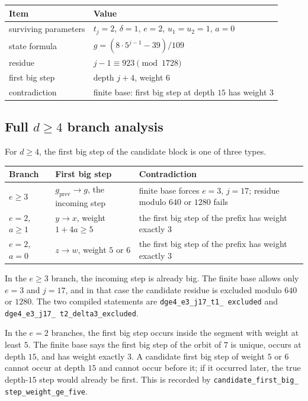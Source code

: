 \begin{center}
\small
\begin{tabular}{@{}p{}p{}@{}}
\toprule
Item & Value \\
\midrule
surviving parameters &
  $t_j=2$, $\delta=1$, $e=2$, $u_1=u_2=1$, $a=0$ \\
state formula & $g=(8\cdot5^{j-1}-39)/109$ \\
residue & $j-1\equiv923\pmod{1728}$ \\
first big step & depth $j+4$, weight $6$ \\
contradiction & finite base: first big step at depth $15$ has weight $3$ \\
\bottomrule
\end{tabular}
\end{center}

\subsection{Full $d\ge4$ branch analysis}

For $d\ge4$, the first big step of the candidate block is one of three
types.

\begin{center}
\small
\begin{tabular}{@{}p{}p{}p{}@{}}
\toprule
Branch & First big step & Contradiction \\
\midrule
$e\ge3$ & $g_{\mathrm{prev}}\to g$, the incoming step &
  finite base forces $e=3$, $j=17$; residue modulo $640$ or $1280$
  fails \\
$e=2$, $a\ge1$ & $y\to x$, weight $1+4a\ge5$ &
  the first big step of the prefix has weight exactly $3$ \\
$e=2$, $a=0$ & $z\to w$, weight $5$ or $6$ &
  the first big step of the prefix has weight exactly $3$ \\
\bottomrule
\end{tabular}
\end{center}

In the $e\ge3$ branch, the incoming step is already big.  The finite
base allows only $e=3$ and $j=17$, and in that case the candidate
residue is excluded modulo $640$ or $1280$.  The two compiled
statements are
\texttt{dge4\_\allowbreak e3\_\allowbreak j17\_\allowbreak t1\_\allowbreak
excluded} and
\texttt{dge4\_\allowbreak e3\_\allowbreak j17\_\allowbreak
t2\_\allowbreak delta3\_\allowbreak excluded}.

In the $e=2$ branches, the first big step occurs inside the segment
with weight at least $5$.  The finite base says the first big step of
the orbit of $7$ is unique, occurs at depth $15$, and has weight
exactly $3$.  A candidate first big step of weight $5$ or $6$ cannot
occur at depth $15$ and cannot occur before it; if it occurred later,
the true depth-$15$ step would already be first.  This is recorded by
\texttt{candidate\_\allowbreak first\_\allowbreak big\_\allowbreak
step\_\allowbreak weight\_\allowbreak ge\_\allowbreak five}.

